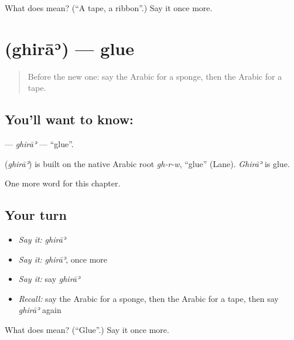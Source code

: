 \begin{tcolorbox}[breakable,colback=teal!4,colframe=teal!35!black,title={Before you move on}]
What does  mean? (\textquotedblleft{}A tape, a ribbon\textquotedblright{}.) Say it once more.
\end{tcolorbox}
\section[\texorpdfstring{\ar{غراء} (ghirāʾ)}{غراء (ghirāʾ)}]{ (ghirāʾ) — glue}

\label{lesson:AR-C279-ghira}



\begin{quote}
Before the new one: say the Arabic for a sponge, then the Arabic for a tape.
\end{quote}

\subsection*{You'll want to know: }
\textbf{} — \emph{ghirāʾ} — \textquotedblleft{}glue\textquotedblright{}.

\begin{cousinweb}
\textbf{} (\emph{ghirāʾ}) is built on the native Arabic root \emph{gh-r-w}, \textquotedblleft{}glue\textquotedblright{} (Lane). \emph{Ghirāʾ} is glue.
\end{cousinweb}

\begin{grammarlens}[title={What you've built}]
One more word for this chapter.
\end{grammarlens}

\subsection*{Your turn}
\begin{itemize}
\raggedright
  \item \emph{Say it:} \emph{ghirāʾ}
  \item \emph{Say it:} \emph{ghirāʾ}, once more
  \item \emph{Say it:} say \emph{ghirāʾ}
  \item \emph{Recall:} say the Arabic for a sponge, then the Arabic for a tape, then say \emph{ghirāʾ} again
\end{itemize}

\begin{tcolorbox}[breakable,colback=teal!4,colframe=teal!35!black,title={Before you move on}]
What does  mean? (\textquotedblleft{}Glue\textquotedblright{}.) Say it once more.
\end{tcolorbox}
